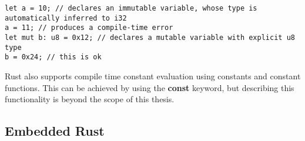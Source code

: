 \begin{lstlisting}
let a = 10; // declares an immutable variable, whose type is automatically inferred to i32
a = 11; // produces a compile-time error
let mut b: u8 = 0x12; // declares a mutable variable with explicit u8 type
b = 0x24; // this is ok
\end{lstlisting}

Rust also supports compile time constant evaluation using constants and constant functions.
This can be achieved by using the \textbf{const} keyword, but describing this functionality is beyond the scope of this thesis.

\subsection{Embedded Rust}
\label{subsec:embedded_rust}
